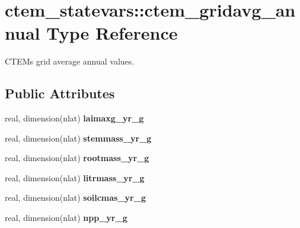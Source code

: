 \hypertarget{structctem__statevars_1_1ctem__gridavg__annual}{}\section{ctem\+\_\+statevars\+:\+:ctem\+\_\+gridavg\+\_\+annual Type Reference}
\label{structctem__statevars_1_1ctem__gridavg__annual}


C\+T\+E\+M\textquotesingle{}s grid average annual values.  


\subsection*{Public Attributes}
\begin{DoxyCompactItemize}
\item 
\hypertarget{structctem__statevars_1_1ctem__gridavg__annual_a236c469418485ab0603f47f5b11ae190}{}real, dimension(nlat) {\bfseries laimaxg\+\_\+yr\+\_\+g}\label{structctem__statevars_1_1ctem__gridavg__annual_a236c469418485ab0603f47f5b11ae190}

\item 
\hypertarget{structctem__statevars_1_1ctem__gridavg__annual_aa3f85e2b8f4292b5f08799a54adcc56f}{}real, dimension(nlat) {\bfseries stemmass\+\_\+yr\+\_\+g}\label{structctem__statevars_1_1ctem__gridavg__annual_aa3f85e2b8f4292b5f08799a54adcc56f}

\item 
\hypertarget{structctem__statevars_1_1ctem__gridavg__annual_af6b0e5cbd95bdb9c0c38fffeb7be5582}{}real, dimension(nlat) {\bfseries rootmass\+\_\+yr\+\_\+g}\label{structctem__statevars_1_1ctem__gridavg__annual_af6b0e5cbd95bdb9c0c38fffeb7be5582}

\item 
\hypertarget{structctem__statevars_1_1ctem__gridavg__annual_a7ca56fc20e85b9a1877a6eb385a0600f}{}real, dimension(nlat) {\bfseries litrmass\+\_\+yr\+\_\+g}\label{structctem__statevars_1_1ctem__gridavg__annual_a7ca56fc20e85b9a1877a6eb385a0600f}

\item 
\hypertarget{structctem__statevars_1_1ctem__gridavg__annual_a514a9d55f42b989f4c1f2287a4f68763}{}real, dimension(nlat) {\bfseries soilcmas\+\_\+yr\+\_\+g}\label{structctem__statevars_1_1ctem__gridavg__annual_a514a9d55f42b989f4c1f2287a4f68763}

\item 
\hypertarget{structctem__statevars_1_1ctem__gridavg__annual_aacace1332c7930a31454a6b55f281c44}{}real, dimension(nlat) {\bfseries npp\+\_\+yr\+\_\+g}\label{structctem__statevars_1_1ctem__gridavg__annual_aacace1332c7930a31454a6b55f281c44}


\end{DoxyCompactItemize}
